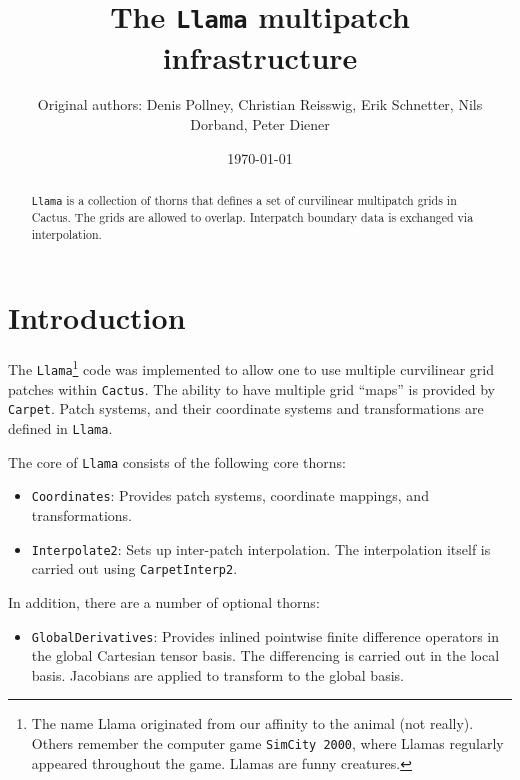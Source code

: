 \documentclass{article}
\begin{document}
\title{The {\tt Llama} multipatch infrastructure}
\author{Original authors: Denis Pollney, Christian Reisswig, Erik Schnetter, Nils Dorband, Peter Diener}

\date{\today}

\maketitle


\begin{abstract}
  {\tt Llama} is a collection of thorns that defines a set of curvilinear multipatch grids in Cactus.
  The grids are allowed to overlap. Interpatch boundary data is exchanged via interpolation.
\end{abstract}

\section{Introduction}
\label{sec:intro}

The {\tt Llama}\footnote{The name Llama originated from our affinity to the animal (not really).
Others remember the computer game {\tt SimCity 2000}, where Llamas regularly appeared throughout the game.
Llamas are funny creatures.}
code was implemented to allow one to use multiple curvilinear grid patches within {\tt Cactus}.
The ability to have multiple grid ``maps'' is provided by {\tt Carpet}. 
Patch systems, and their coordinate systems and transformations are defined in {\tt Llama}.

The core of {\tt Llama} consists of the following core thorns:
\begin{itemize}
 \item {\tt Coordinates}: Provides patch systems, coordinate mappings, and transformations.
 \item {\tt Interpolate2}: Sets up inter-patch interpolation. The interpolation itself is carried out using {\tt CarpetInterp2}.
\end{itemize}

In addition, there are a number of optional thorns:
\begin{itemize}
 \item {\tt GlobalDerivatives}: Provides inlined pointwise finite difference operators in the global Cartesian tensor basis. 
       The differencing is carried out in the local basis. Jacobians are applied to transform to the global basis.
\end{itemize}
\end{document}
